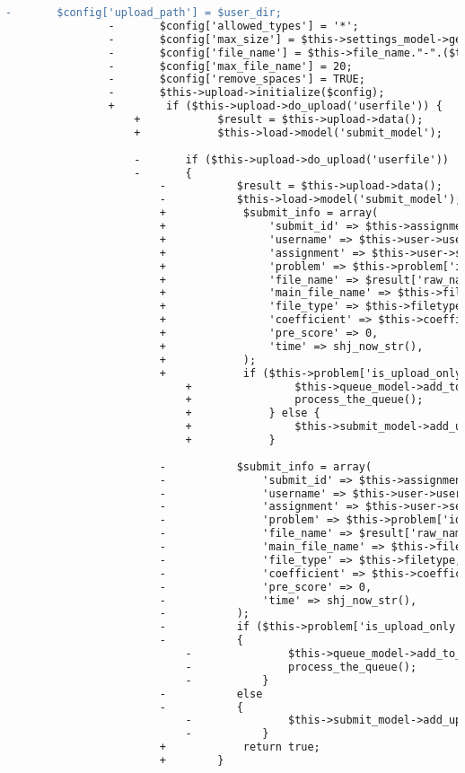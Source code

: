 \begin{lstlisting}[language=diff, caption=Perubahan pada kode Submit.php]
				-		$config['upload_path'] = $user_dir;
				-		$config['allowed_types'] = '*';
				-		$config['max_size']	= $this->settings_model->get_setting('file_size_limit');
				-		$config['file_name'] = $this->file_name."-".($this->user->selected_assignment['total_submits']+1).".".$this->ext;
				-		$config['max_file_name'] = 20;
				-		$config['remove_spaces'] = TRUE;
				-		$this->upload->initialize($config);
				+        if ($this->upload->do_upload('userfile')) {
					+            $result = $this->upload->data();
					+            $this->load->model('submit_model');
					
					-		if ($this->upload->do_upload('userfile'))
					-		{
						-			$result = $this->upload->data();
						-			$this->load->model('submit_model');
						+            $submit_info = array(
						+                'submit_id' => $this->assignment_model->increase_total_submits($this->user->selected_assignment['id']),
						+                'username' => $this->user->username,
						+                'assignment' => $this->user->selected_assignment['id'],
						+                'problem' => $this->problem['id'],
						+                'file_name' => $result['raw_name'],
						+                'main_file_name' => $this->file_name,
						+                'file_type' => $this->filetype,
						+                'coefficient' => $this->coefficient,
						+                'pre_score' => 0,
						+                'time' => shj_now_str(),
						+            );
						+            if ($this->problem['is_upload_only'] == 0) {
							+                $this->queue_model->add_to_queue($submit_info);
							+                process_the_queue();
							+            } else {
							+                $this->submit_model->add_upload_only($submit_info);
							+            }
						
						-			$submit_info = array(
						-				'submit_id' => $this->assignment_model->increase_total_submits($this->user->selected_assignment['id']),
						-				'username' => $this->user->username,
						-				'assignment' => $this->user->selected_assignment['id'],
						-				'problem' => $this->problem['id'],
						-				'file_name' => $result['raw_name'],
						-				'main_file_name' => $this->file_name,
						-				'file_type' => $this->filetype,
						-				'coefficient' => $this->coefficient,
						-				'pre_score' => 0,
						-				'time' => shj_now_str(),
						-			);
						-			if ($this->problem['is_upload_only'] == 0)
						-			{
							-				$this->queue_model->add_to_queue($submit_info);
							-				process_the_queue();
							-			}
						-			else
						-			{
							-				$this->submit_model->add_upload_only($submit_info);
							-			}
						+            return true;
						+        }
					

\end{lstlisting}
